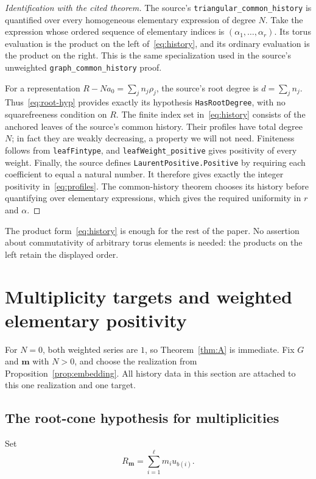\documentclass[11pt,reqno]{amsart}
\newcommand{\mm}{\mathbf m}
\newcommand{\decl}[1]{\nolinkurl{#1}}
\theoremstyle{definition}
\theoremstyle{remark}
\numberwithin{equation}{section}
\begin{document}
\begin{proof}[Identification with the cited theorem]
The source's \decl{triangular_common_history} is quantified over every
homogeneous elementary expression of degree $N$.  Take the expression
whose ordered sequence of elementary indices is
$(\alpha_1,\ldots,\alpha_r)$.  Its torus evaluation is the product on
the left of~\eqref{eq:history}, and its ordinary evaluation is the
product on the right.  This is the same specialization used in the
source's unweighted \decl{graph_common_history} proof.

For a representation $R-Na_0=\sum_j n_j\rho_j$, the source's root
degree is $d=\sum_j n_j$.  Thus~\eqref{eq:root-hyp} provides exactly
its hypothesis \decl{HasRootDegree}, with no squarefreeness condition
on $R$.  The finite index set in~\eqref{eq:history} consists of the
anchored leaves of the source's common history.  Their profiles have
total degree $N$; in fact they are weakly decreasing, a property we
will not need.  Finiteness follows from \decl{leafFintype}, and
\decl{leafWeight_positive} gives positivity of every weight.  Finally,
the source defines \decl{LaurentPositive.Positive} by requiring each
coefficient to equal a natural number.  It therefore gives exactly the
integer positivity in~\eqref{eq:profiles}.  The common-history theorem
chooses its history before quantifying over elementary expressions,
which gives the required uniformity in $r$ and $\alpha$.
\end{proof}

The product form~\eqref{eq:history} is enough for the rest of the
paper.  No assertion about commutativity of arbitrary torus elements
is needed: the products on the left retain the displayed order.

\section{Multiplicity targets and weighted elementary positivity}\label{sec:weighted-proof}

For $N=0$, both weighted series are $1$, so Theorem~\ref{thm:A}
is immediate.  Fix $G$ and $\mm$ with $N>0$, and choose
the realization from Proposition~\ref{prop:embedding}.  All history
data in this section are attached to this one realization and one
target.

\subsection{The root-cone hypothesis for multiplicities}
Set
\begin{equation}\label{eq:target}
 R_{\mm}=\sum_{i=1}^{\ell}m_i u_{b(i)}.
\end{equation}
\end{document}
